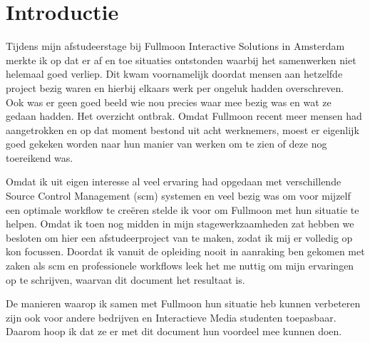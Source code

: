 \setcounter{chapter}{0}
\chapter{Introductie}
  
Tijdens mijn afstudeerstage bij Fullmoon Interactive Solutions in Amsterdam merkte ik op dat er af en toe situaties ontstonden waarbij het samenwerken niet helemaal goed verliep. Dit kwam voornamelijk doordat mensen aan hetzelfde project bezig waren en hierbij elkaars werk per ongeluk hadden overschreven. Ook was er geen goed beeld wie nou precies waar mee bezig was en wat ze gedaan hadden. Het overzicht ontbrak. Omdat Fullmoon recent meer mensen had aangetrokken en op dat moment bestond uit acht werknemers, moest er eigenlijk goed gekeken worden naar hun manier van werken om te zien of deze nog toereikend was.

Omdat ik uit eigen interesse al veel ervaring had opgedaan met verschillende Source Control Management ({\sc scm}) systemen en veel bezig was om voor mijzelf een optimale workflow te creëren stelde ik voor om Fullmoon met hun situatie te helpen. Omdat ik toen nog midden in mijn stagewerkzaamheden zat hebben we besloten om hier een afstudeerproject van te maken, zodat ik mij er volledig op kon focussen. Doordat ik vanuit de opleiding nooit in aanraking ben gekomen met zaken als {\sc scm} en professionele workflows leek het me nuttig om mijn ervaringen op te schrijven, waarvan dit document het resultaat is.

De manieren waarop ik samen met Fullmoon hun situatie heb kunnen verbeteren zijn ook voor andere bedrijven en Interactieve Media studenten toepasbaar. Daarom hoop ik dat ze er met dit document hun voordeel mee kunnen doen.
